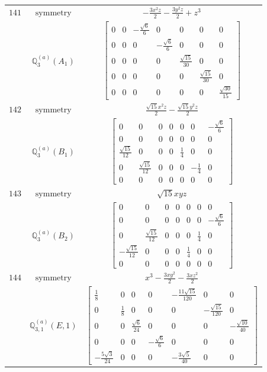 \documentclass[fleqn,8pt,landscape]{jsarticle}
\begin{document}
\begin{longtable}{ccc}
$ 141 $ & $ \text{symmetry} $ & $ - \frac{3 x^{2} z}{2} - \frac{3 y^{2} z}{2} + z^{3} $ \\
$  $ & $ \mathbb{Q}_{3}^{(a)}(A_{1}) $ & $ \begin{bmatrix} 0 & 0 & - \frac{\sqrt{6}}{6} & 0 & 0 & 0 & 0 \\ 0 & 0 & 0 & - \frac{\sqrt{6}}{6} & 0 & 0 & 0 \\ 0 & 0 & 0 & 0 & \frac{\sqrt{15}}{30} & 0 & 0 \\ 0 & 0 & 0 & 0 & 0 & \frac{\sqrt{15}}{30} & 0 \\ 0 & 0 & 0 & 0 & 0 & 0 & \frac{\sqrt{30}}{15} \end{bmatrix} $ \\ \hline
$ 142 $ & $ \text{symmetry} $ & $ \frac{\sqrt{15} x^{2} z}{2} - \frac{\sqrt{15} y^{2} z}{2} $ \\
$  $ & $ \mathbb{Q}_{3}^{(a)}(B_{1}) $ & $ \begin{bmatrix} 0 & 0 & 0 & 0 & 0 & 0 & - \frac{\sqrt{6}}{6} \\ 0 & 0 & 0 & 0 & 0 & 0 & 0 \\ \frac{\sqrt{15}}{12} & 0 & 0 & 0 & \frac{1}{4} & 0 & 0 \\ 0 & \frac{\sqrt{15}}{12} & 0 & 0 & 0 & - \frac{1}{4} & 0 \\ 0 & 0 & 0 & 0 & 0 & 0 & 0 \end{bmatrix} $ \\ \hline
$ 143 $ & $ \text{symmetry} $ & $ \sqrt{15} x y z $ \\
$  $ & $ \mathbb{Q}_{3}^{(a)}(B_{2}) $ & $ \begin{bmatrix} 0 & 0 & 0 & 0 & 0 & 0 & 0 \\ 0 & 0 & 0 & 0 & 0 & 0 & - \frac{\sqrt{6}}{6} \\ 0 & \frac{\sqrt{15}}{12} & 0 & 0 & 0 & \frac{1}{4} & 0 \\ - \frac{\sqrt{15}}{12} & 0 & 0 & 0 & \frac{1}{4} & 0 & 0 \\ 0 & 0 & 0 & 0 & 0 & 0 & 0 \end{bmatrix} $ \\ \hline
$ 144 $ & $ \text{symmetry} $ & $ x^{3} - \frac{3 x y^{2}}{2} - \frac{3 x z^{2}}{2} $ \\
$  $ & $ \mathbb{Q}_{3,1}^{(a)}(E,1) $ & $ \begin{bmatrix} \frac{1}{8} & 0 & 0 & 0 & - \frac{11 \sqrt{15}}{120} & 0 & 0 \\ 0 & \frac{1}{8} & 0 & 0 & 0 & - \frac{\sqrt{15}}{120} & 0 \\ 0 & 0 & \frac{\sqrt{6}}{24} & 0 & 0 & 0 & - \frac{\sqrt{10}}{40} \\ 0 & 0 & 0 & - \frac{\sqrt{6}}{6} & 0 & 0 & 0 \\ - \frac{5 \sqrt{3}}{24} & 0 & 0 & 0 & - \frac{3 \sqrt{5}}{40} & 0 & 0 \end{bmatrix} $ \\ \hline

\end{longtable}
\end{document}
